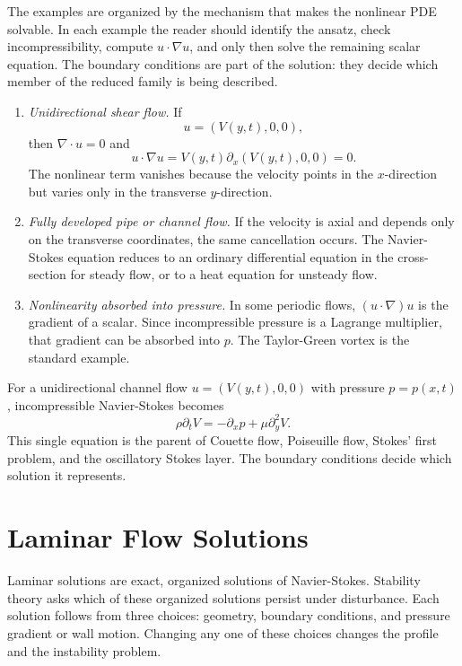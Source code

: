 The examples are organized by the mechanism that makes the nonlinear PDE
solvable.  In each example the reader should identify the ansatz, check
incompressibility, compute \(u\cdot\nabla u\), and only then solve the
remaining scalar equation.  The boundary conditions are part of the solution:
they decide which member of the reduced family is being described.

\begin{enumerate}
\item \emph{Unidirectional shear flow.} If
\[
  u=(V(y,t),0,0),
\]
then \(\nabla\cdot u=0\) and
\[
  u\cdot\nabla u=V(y,t)\partial_x(V(y,t),0,0)=0.
\]
The nonlinear term vanishes because the velocity points in the \(x\)-direction
but varies only in the transverse \(y\)-direction.

\item \emph{Fully developed pipe or channel flow.} If the velocity is axial and
depends only on the transverse coordinates, the same cancellation occurs. The
Navier-Stokes equation reduces to an ordinary differential equation in the
cross-section for steady flow, or to a heat equation for unsteady flow.

\item \emph{Nonlinearity absorbed into pressure.} In some periodic flows,
\((u\cdot\nabla)u\) is the gradient of a scalar. Since incompressible pressure
is a Lagrange multiplier, that gradient can be absorbed into \(p\). The
Taylor-Green vortex is the standard example.
\end{enumerate}

For a unidirectional channel flow \(u=(V(y,t),0,0)\) with pressure
\(p=p(x,t)\), incompressible Navier-Stokes becomes
\[
  \rho\partial_t V
  =
  -\partial_xp+\mu\partial_y^2V.
\]
This single equation is the parent of Couette flow, Poiseuille flow, Stokes'
first problem, and the oscillatory Stokes layer. The boundary conditions decide
which solution it represents.

\section{Laminar Flow Solutions}
\label{sec:laminar-solutions}

Laminar solutions are exact, organized solutions of Navier-Stokes. Stability
theory asks which of these organized solutions persist under disturbance.
Each solution follows from three choices: geometry, boundary conditions, and
pressure gradient or wall motion. Changing any one of these choices changes the
profile and the instability problem.

